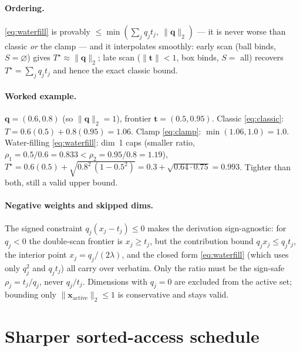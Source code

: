 \documentclass[11pt,a4paper]{article}
\newcommand{\qv}{\mathbf{q}}
\newcommand{\xv}{\mathbf{x}}
\newcommand{\tv}{\mathbf{t}}
\newcommand{\norm}[1]{\lVert #1 \rVert}
\begin{document}
\paragraph{Ordering.} \eqref{eq:waterfill} is provably
$\le\min(\sum_j q_j t_j,\ \norm{\qv}_2)$ --- it is never worse than classic
\emph{or} the clamp --- and it interpolates smoothly: early scan (ball binds,
$S=\varnothing$) gives $T^\star\approx\norm{\qv}_2$; late scan
($\norm{\tv}<1$, box binds, $S=$ all) recovers $T^\star=\sum_j q_j t_j$ and hence
the exact classic bound.

\paragraph{Worked example.} $\qv=(0.6,0.8)$ (so $\norm{\qv}_2=1$),
frontier $\tv=(0.5,0.95)$. Classic \eqref{eq:classic}:
$T=0.6(0.5)+0.8(0.95)=1.06$. Clamp \eqref{eq:clamp}: $\min(1.06,1.0)=1.0$.
Water-filling \eqref{eq:waterfill}: dim~1 caps (smaller ratio,
$\rho_1=0.5/0.6=0.833<\rho_2=0.95/0.8=1.19$),
$T^\star=0.6(0.5)+\sqrt{0.8^2\,(1-0.5^2)}=0.3+\sqrt{0.64\cdot0.75}=0.993$.
Tighter than both, still a valid upper bound.

\paragraph{Negative weights and skipped dims.} The signed constraint
$q_j(x_j-t_j)\le0$ makes the derivation sign-agnostic: for $q_j<0$ the
double-scan frontier is $x_j\ge t_j$, but the contribution bound $q_j x_j\le q_j
t_j$, the interior point $x_j=q_j/(2\lambda)$, and the closed form
\eqref{eq:waterfill} (which uses only $q_j^2$ and $q_j t_j$) all carry over
verbatim. Only the ratio must be the sign-safe $\rho_j=t_j/q_j$, never $q_j/t_j$.
Dimensions with $q_j=0$ are excluded from the active set; bounding only
$\norm{\xv_{\text{active}}}_2\le1$ is conservative and stays valid.

\section{Sharper sorted-access schedule}
\end{document}
